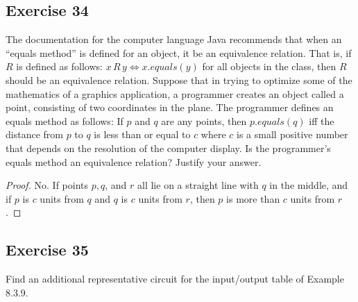 \documentclass[14pt]{extarticle}
\begin{document}
\subsection{Exercise 34}
The documentation for the computer language Java recommends that when an “equals method” is defined for an object, it
be an equivalence relation. That is, if $R$ is defined as follows: \(x \,R\, y \iff x.equals(y)\) for all objects in
the class, then $R$ should be an equivalence relation. Suppose that in trying to optimize some of the mathematics
of a graphics application, a programmer creates an object called a point, consisting of two coordinates in the plane.
The programmer defines an equals method as follows: If $p$ and $q$ are any points, then \(p.equals(q)\) iff the
distance from $p$ to $q$ is less than or equal to $c$ where $c$ is a small positive number that depends on the
resolution of the computer display. Is the programmer’s equals method an equivalence relation? Justify your answer.

\begin{proof}
        No. If points \(p, q\), and $r$ all lie on a straight line with $q$ in the middle, and if $p$ is $c$ units from $q$
        and $q$ is $c$ units from $r$, then $p$ is more than $c$ units from $r$.
\end{proof}

\subsection{Exercise 35}
Find an additional representative circuit for the input/output table of Example 8.3.9.
\end{document}
